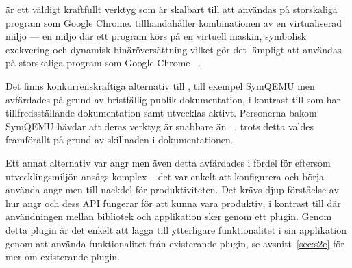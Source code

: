 \stoe{} är ett väldigt kraftfullt verktyg som är skalbart till att användas på
storskaliga program som Google Chrome. \stoe{} tillhandahåller
kombinationen av en virtualiserad miljö — en miljö där ett program körs på en
virtuell maskin, symbolisk exekvering och dynamisk binäröversättning vilket gör
det lämpligt att användas på storskaliga program som Google Chrome ~\cite{s2e}.

Det finns konkurrenskraftiga alternativ till \stoe{}, till exempel SymQEMU men
avfärdades på grund av bristfällig publik dokumentation, i kontrast till \stoe{}
som har tillfredsställande dokumentation samt utvecklas aktivt. Personerna bakom
SymQEMU hävdar att deras verktyg är snabbare än \stoe{}
~\cite{symqemu}, trots detta valdes \stoe{}
framförallt på grund av skillnaden i dokumentationen.

Ett annat alternativ var angr men även detta avfärdades i fördel för \stoe{}
eftersom utvecklingsmiljön ansågs komplex – det var enkelt att konfigurera och börja
använda angr men till nackdel för produktiviteten. Det krävs djup förståelse av
hur angr och dess API fungerar för att kunna vara produktiv, i kontrast till
\stoe{} där användningen mellan bibliotek och applikation sker genom ett plugin.
Genom detta plugin är det enkelt att lägga till ytterligare funktionalitet i sin
applikation genom att använda funktionalitet från existerande plugin, se
avsnitt~\ref{sec:s2e} för mer om existerande plugin. 

